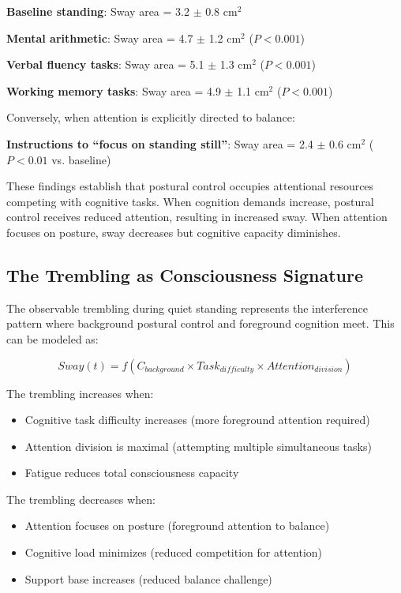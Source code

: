 \documentclass[12pt,a4paper]{article}
\begin{document}
\textbf{Baseline standing}: Sway area = 3.2 $\pm$ 0.8 cm$^2$

\textbf{Mental arithmetic}: Sway area = 4.7 $\pm$ 1.2 cm$^2$ ($P < 0.001$) \citep{lajoie1993attentional}

\textbf{Verbal fluency tasks}: Sway area = 5.1 $\pm$ 1.3 cm$^2$ ($P < 0.001$)

\textbf{Working memory tasks}: Sway area = 4.9 $\pm$ 1.1 cm$^2$ ($P < 0.001$)

Conversely, when attention is explicitly directed to balance:

\textbf{Instructions to ``focus on standing still''}: Sway area = 2.4 $\pm$ 0.6 cm$^2$ ($P < 0.01$ vs. baseline)

These findings establish that postural control occupies attentional resources competing with cognitive tasks. When cognition demands increase, postural control receives reduced attention, resulting in increased sway. When attention focuses on posture, sway decreases but cognitive capacity diminishes.

\subsection{The Trembling as Consciousness Signature}

The observable trembling during quiet standing represents the interference pattern where background postural control and foreground cognition meet. This can be modeled as:

\begin{equation}
Sway(t) = f\left(C_{background} \times Task_{difficulty} \times Attention_{division}\right)
\end{equation}

The trembling increases when:
\begin{itemize}
\item Cognitive task difficulty increases (more foreground attention required)
\item Attention division is maximal (attempting multiple simultaneous tasks)
\item Fatigue reduces total consciousness capacity
\end{itemize}

The trembling decreases when:
\begin{itemize}
\item Attention focuses on posture (foreground attention to balance)
\item Cognitive load minimizes (reduced competition for attention)
\item Support base increases (reduced balance challenge)
\end{itemize}
\end{document}
